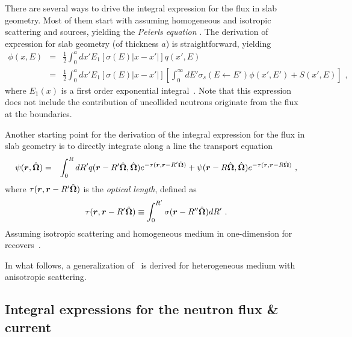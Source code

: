 There are several ways to drive the integral expression for the flux in slab geometry. Most of them start with assuming homogeneous and isotropic scattering and sources, yielding the \emph{Peierls equation} \cite{Davison-1957,Case-1967,Bell-1970,Pomraning-1973,Duderstadt-1979,Lewis-1984}. The derivation of expression for slab geometry (of thickness $a$) is straightforward, yielding
\begin{eqnarray}\label{eq:flux-slab-l-0-no-bndry-terms}
\phi(x,E)&=&\frac{1}{2}\int_0^a { dx'
	E_1\left[\sigma(E)\lvert x-x'\rvert\right] q(x',E) 
}\nonumber \\
&=& \frac{1}{2}\int_0^a { \!\!\! dx'
	E_1\left[\sigma(E)\lvert x-x'\rvert\right]
	\left[
	\int_0^\infty { \!\!\! dE'
		\sigma_s(E\leftarrow E')\phi(x',E') 
	} + S(x',E)
	\right] 
} \,\, ,
\end{eqnarray}
where $E_1(x)$ is a first order exponential integral~\cite{Abramowitz-1964}. Note that this expression does not include the contribution of uncollided neutrons originate from the flux at the boundaries.

Another starting point for the derivation of the integral expression for the flux in slab geometry is to directly integrate along a line the transport equation~\cite{Davison-1957,Pomraning-1973,Duderstadt-1979,Lewis-1984}
\begin{eqnarray}\label{eq:full-ITE-w-bndry-terms}
\psi(\bm{r},\hat{\bm{\Omega}}) &=& \int_0^R { dR'
	q(\bm{r}-R'\hat{\bm{\Omega}},\hat{\bm{\Omega}}) e^{-\tau(\bm{r},\bm{r}-R'\hat{\bm{\Omega}})}
} 
+\psi(\bm{r}-R\hat{\bm{\Omega}},\hat{\bm{\Omega}}) e^{-\tau(\bm{r},\bm{r}-R\hat{\bm{\Omega}})}
\,\, ,
\end{eqnarray}
where $\tau(\bm{r},\bm{r}-R'\hat{\bm{\Omega}})$ is the \emph{optical length}, defined as
\begin{equation}\label{eq:opl}
\tau(\bm{r},\bm{r}-R'\hat{\bm{\Omega}}) \equiv 
\int_0^{R'} {\sigma(\bm{r}-R''\hat{\bm{\Omega}})dR'} \,\, .
\end{equation}
Assuming isotropic scattering and homogeneous medium in one-dimension for~ recovers~. 

In what follows, a generalization of~ is derived for heterogeneous medium with anisotropic scattering.  
%
\subsection{Integral expressions for the neutron flux \& current}
\label{sec:int-flux-J}

